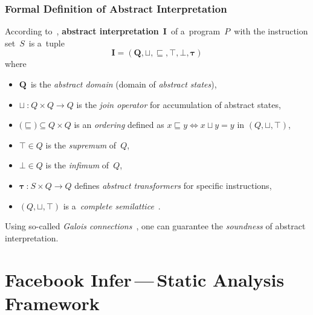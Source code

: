 \subsubsection{Formal Definition of Abstract Interpretation}

According to~\cite{AILatticeModelCousot, savAI},
\textbf{abstract interpretation}~$ \boldsymbol{I} $~of a~program~$ P $~with
the instruction set~$ S $~is a~tuple
$$ \boldsymbol{I = (Q, \sqcup, \sqsubseteq, \top, \bot, \tau)} $$
where
\begin{itemize}
    \item
        $ \boldsymbol{Q} $~is the \emph{abstract domain} (domain of
        \emph{abstract states}),

    \item
        $ \boldsymbol{\sqcup}~\text{:}~Q \times Q \rightarrow Q $
        is the \emph{join operator} for accumulation of abstract states,

    \item
        $ \text{(}\boldsymbol{\sqsubseteq}\text{)} \subseteq Q \times Q $ is
        an \emph{ordering} defined as
        $ x \sqsubseteq y \Leftrightarrow x \sqcup y = y $ in
        $ (Q, \sqcup, \top) $,

    \item
        $ \boldsymbol{\top} \in Q $ is the \emph{supremum} of~$ Q $,

    \item
        $ \boldsymbol{\bot} \in Q $ is the \emph{infimum} of~$ Q $,

    \item
        $ \boldsymbol{\tau}~\text{:}~S \times Q \rightarrow Q $
        defines \emph{abstract transformers} for specific instructions,

    \item
        $ (Q, \sqcup, \top) $ is a~\emph{complete
        semilattice}~\cite{harmimBP, savAI}.
\end{itemize}

Using so-called \emph{Galois connections}~\cite{programAnalysisNielson,
wideningNarrowingCousot, savAI, AICousotWeb}, one can guarantee the
\emph{soundness} of abstract interpretation.


\section{\texorpdfstring{Facebook Infer\,---\,Static Analysis Framework}{%
    Facebook Infer - Static Analysis Framework%
}}
\label{sec:fbinfer}

